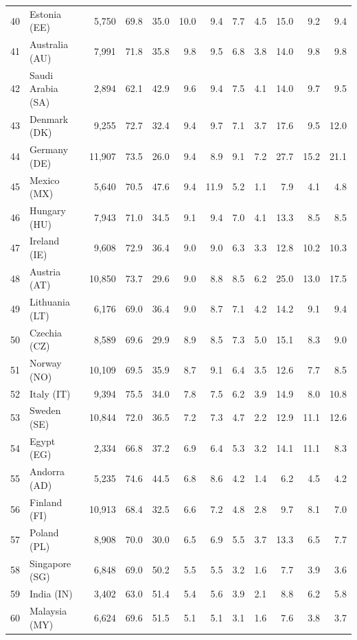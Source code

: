 \documentclass[10pt,a4paper,twocolumn]{article}
\begin{document}
\begin{tabular}{@{}rlrrrrrrrrrr@{}}
40 & Estonia (EE) & 5,750 & 69.8 & 35.0 & 10.0 & 9.4 & 7.7 & 4.5 & 15.0 & 9.2 & 9.4 \\
41 & Australia (AU) & 7,991 & 71.8 & 35.8 & 9.8 & 9.5 & 6.8 & 3.8 & 14.0 & 9.8 & 9.8 \\
42 & Saudi Arabia (SA) & 2,894 & 62.1 & 42.9 & 9.6 & 9.4 & 7.5 & 4.1 & 14.0 & 9.7 & 9.5 \\
43 & Denmark (DK) & 9,255 & 72.7 & 32.4 & 9.4 & 9.7 & 7.1 & 3.7 & 17.6 & 9.5 & 12.0 \\
44 & Germany (DE) & 11,907 & 73.5 & 26.0 & 9.4 & 8.9 & 9.1 & 7.2 & 27.7 & 15.2 & 21.1 \\
45 & Mexico (MX) & 5,640 & 70.5 & 47.6 & 9.4 & 11.9 & 5.2 & 1.1 & 7.9 & 4.1 & 4.8 \\
46 & Hungary (HU) & 7,943 & 71.0 & 34.5 & 9.1 & 9.4 & 7.0 & 4.1 & 13.3 & 8.5 & 8.5 \\
47 & Ireland (IE) & 9,608 & 72.9 & 36.4 & 9.0 & 9.0 & 6.3 & 3.3 & 12.8 & 10.2 & 10.3 \\
48 & Austria (AT) & 10,850 & 73.7 & 29.6 & 9.0 & 8.8 & 8.5 & 6.2 & 25.0 & 13.0 & 17.5 \\
49 & Lithuania (LT) & 6,176 & 69.0 & 36.4 & 9.0 & 8.7 & 7.1 & 4.2 & 14.2 & 9.1 & 9.4 \\
50 & Czechia (CZ) & 8,589 & 69.6 & 29.9 & 8.9 & 8.5 & 7.3 & 5.0 & 15.1 & 8.3 & 9.0 \\
51 & Norway (NO) & 10,109 & 69.5 & 35.9 & 8.7 & 9.1 & 6.4 & 3.5 & 12.6 & 7.7 & 8.5 \\
52 & Italy (IT) & 9,394 & 75.5 & 34.0 & 7.8 & 7.5 & 6.2 & 3.9 & 14.9 & 8.0 & 10.8 \\
53 & Sweden (SE) & 10,844 & 72.0 & 36.5 & 7.2 & 7.3 & 4.7 & 2.2 & 12.9 & 11.1 & 12.6 \\
54 & Egypt (EG) & 2,334 & 66.8 & 37.2 & 6.9 & 6.4 & 5.3 & 3.2 & 14.1 & 11.1 & 8.3 \\
55 & Andorra (AD) & 5,235 & 74.6 & 44.5 & 6.8 & 8.6 & 4.2 & 1.4 & 6.2 & 4.5 & 4.2 \\
56 & Finland (FI) & 10,913 & 68.4 & 32.5 & 6.6 & 7.2 & 4.8 & 2.8 & 9.7 & 8.1 & 7.0 \\
57 & Poland (PL) & 8,908 & 70.0 & 30.0 & 6.5 & 6.9 & 5.5 & 3.7 & 13.3 & 6.5 & 7.7 \\
58 & Singapore (SG) & 6,848 & 69.0 & 50.2 & 5.5 & 5.5 & 3.2 & 1.6 & 7.7 & 3.9 & 3.6 \\
59 & India (IN) & 3,402 & 63.0 & 51.4 & 5.4 & 5.6 & 3.9 & 2.1 & 8.8 & 6.2 & 5.8 \\
60 & Malaysia (MY) & 6,624 & 69.6 & 51.5 & 5.1 & 5.1 & 3.1 & 1.6 & 7.6 & 3.8 & 3.7 \\

\end{tabular}
\end{document}
